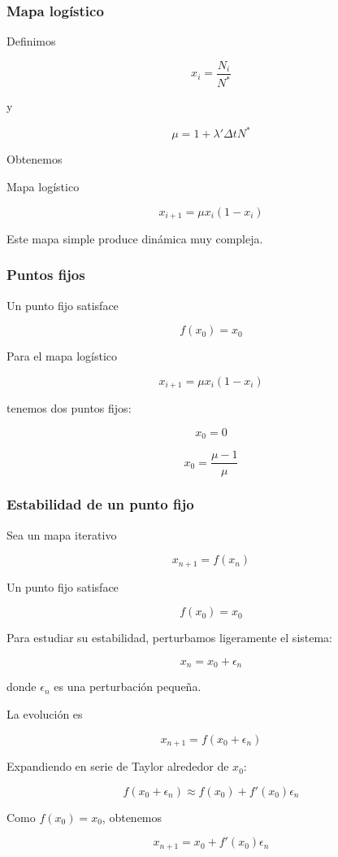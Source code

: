 
\begin{frame}
\frametitle{Mapa logístico}

Definimos

\[
x_i=\frac{N_i}{N^*}
\]

y

\[
\mu=1+\lambda'\Delta t N^*
\]

Obtenemos

\begin{block}{Mapa logístico}

\[
x_{i+1}=\mu x_i(1-x_i)
\]

\end{block}

Este mapa simple produce dinámica muy compleja.

\end{frame}


\begin{frame}
\frametitle{Puntos fijos}

Un punto fijo satisface

\[
f(x_0)=x_0
\]

Para el mapa logístico

\[
x_{i+1}=\mu x_i(1-x_i)
\]

tenemos dos puntos fijos:

\[
x_0=0
\]

\[
x_0=\frac{\mu-1}{\mu}
\]

\end{frame}


\begin{frame}
\footnotesize
\frametitle{Estabilidad de un punto fijo}

Sea un mapa iterativo

\[
x_{n+1}=f(x_n)
\]

Un punto fijo satisface

\[
f(x_0)=x_0
\]

Para estudiar su estabilidad, perturbamos ligeramente el sistema:

\[
x_n = x_0 + \epsilon_n
\]

donde $\epsilon_n$ es una perturbación pequeña.

\vspace{4mm}

La evolución es

\[
x_{n+1}=f(x_0+\epsilon_n)
\]

Expandiendo en serie de Taylor alrededor de $x_0$:

\[
f(x_0+\epsilon_n)
\approx
f(x_0)+f'(x_0)\epsilon_n
\]

Como $f(x_0)=x_0$, obtenemos

\[
x_{n+1}=x_0+f'(x_0)\epsilon_n
\]

\end{frame}



